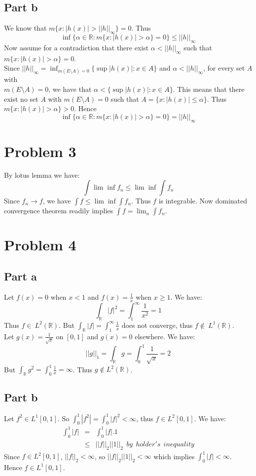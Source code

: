 \documentclass[12pt]{article}
\begin{document}
\subsection*{Part b}
We know that $m\{x : |h(x)| > ||h||_{\infty}\}=0$. Thus
$$\inf \{\alpha \in \mathbb{R}: m\{x:|h(x)| >\alpha \} =0\} \le ||h||_{\infty}$$
Now assume for a contradiction that there exist $\alpha < ||h||_{\infty}$ such that
$m\{x : |h(x)| > \alpha \} = 0$.\\
Since $||h||_{\infty}=\inf_{m(E\setminus A)=0}
\{\sup |h(x)|:x \in A\}$ and $\alpha < ||h||_{\infty}$, for every set $A$ with \\ 
$m(E\setminus A)=0$, we have that $\alpha < \{\sup |h(x)|: x \in A\}$.
This means that there exist no set $A$ with $m(E\setminus A)=0$ such that
$A=\{x: |h(x)| \le \alpha \}$. Thus $m\{x: |h(x)| > \alpha \} > 0$. Hence 
$$\inf \{\alpha \in \mathbb{R}: m\{x:|h(x)| >\alpha \} =0\} = ||h||_{\infty}$$


\section*{Problem 3}
By lotus lemma we have:
$$\int \lim \inf  f_n \le \lim \inf \int f_n$$
Since $f_n \rightarrow f$, we have 
$\int f \le \lim \inf \int f_n$. Thus $f$ is integrable. Now dominated convergence theorem readily implies $\int f = \lim_n \int f_n$.


\clearpage
\section*{Problem 4}
\subsection*{Part a}
Let $f(x)=0$ when $x<1$ and $f(x)=\frac{1}{x}$ when $x \ge 1$. We have:
$$\int_{\mathbb{R}} |f|^2 =\int_1^{\infty} \frac{1}{x^2} = 1$$
Thus $f \in  \ L^2(\mathbb{R})$. But
$\int_{\mathbb{R}} |f| =\int_1^{\infty} \frac{1}{x} $ does not converge, thus $f \not\in \ L^1(\mathbb{R})$. \\
Let $g(x)=\frac{1}{\sqrt{x}}$ on $[0,1]$ and $g(x)=0$ elsewhere. We have:
$$||g||_1=\int_{\mathbb{R}} g
=\int_0^1 \frac{1}{\sqrt{x}}=2$$
But $\int_{\mathbb{R}} g^2=\int_0^1 \frac{1}{x}=\infty$. Thus $g \not\in L^2(\mathbb{R})$.


\subsection*{Part b}
Let $f^2 \in L^1[0,1]$. So
$\int_0^1 |f^2| =\int_0^1 |f|^2 < \infty$, thus
$f \in L^2[0,1]$. We have:
\begin{eqnarray*}
\int_0^1 |f| &=& \int_0^1 |f|.1
\\ & \le &
||f||_2||1||_2 \ \ by \ \ holder's \ \ inequality
\end{eqnarray*} 
Since $f \in L^2[0,1]$, $||f||_2 < \infty$, so
$||f||_2||1||_2 < \infty$ which implies $\int_0^1 |f| < \infty$. \\
Hence $f \in L^1[0,1]$.
\end{document}
